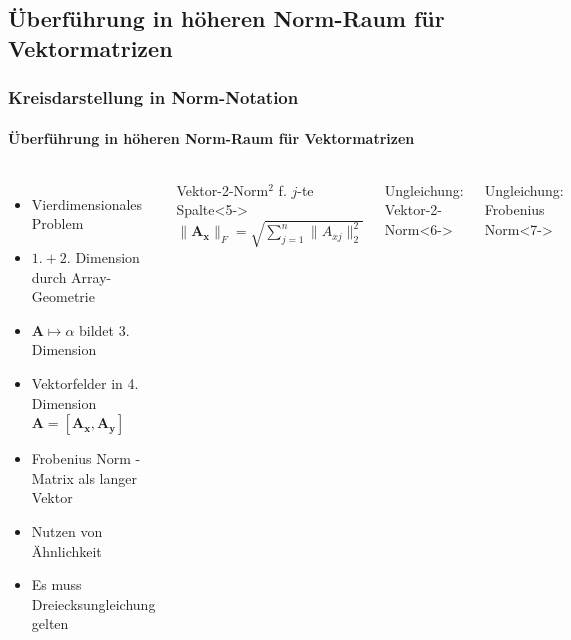 \documentclass{beamer}
\begin{document}
\subsection{Überführung in höheren Norm-Raum für Vektormatrizen}
\begin{frame}
\frametitle{Kreisdarstellung in Norm-Notation}
\framesubtitle{Überführung in höheren Norm-Raum für Vektormatrizen}
\begin{columns}[c]
	\begin{itemize}
		\item<1-> Vierdimensionales Problem
		\item<2-> $1. + 2.$ Dimension durch Array-Geometrie
		\item<3-> $\mathbf{A}\mapsto\alpha$ bildet 3. Dimension
		\item<4-> Vektorfelder in 4. Dimension $\mathbf{A} = [\mathbf{A_x}, \mathbf{A_y}]$
		\item<5-> Frobenius Norm - Matrix als langer Vektor
		\item<6-> Nutzen von Ähnlichkeit
		\item<7-> Es muss Dreiecksungleichung gelten
	\end{itemize}
	
	\begin{block}{Vektor-2-Norm${}^2$ f. $j$-te Spalte}<5->
		$\|\mathbf{A_x}\|_F= \sqrt{\sum_{j=1}^{n}\|A_{xj}\|_2^2}$
	\end{block}
	\begin{block}{Ungleichung: Vektor-2-Norm}<6->
	\end{block}
	\begin{block}{Ungleichung: Frobenius Norm}<7->
	\end{block}
\end{columns}
\end{frame}
\end{document}

